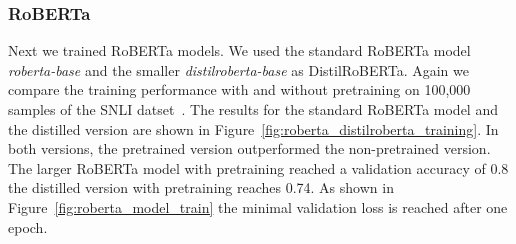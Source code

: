 \documentclass[acmsmall,nonacm]{acmart}
\begin{document}
\newpage
\subsubsection{RoBERTa}
Next we trained RoBERTa models. We used the standard RoBERTa model \textit{roberta-base} and the smaller \textit{distilroberta-base} as DistilRoBERTa. 
Again we compare the training performance with and without pretraining on 100,000 samples of the SNLI datset~\cite{snli-bowman2015}. The results for the standard RoBERTa model and the distilled version are shown in Figure~\ref{fig:roberta_distilroberta_training}. In both versions, the pretrained version outperformed the non-pretrained version. The larger RoBERTa model with pretraining reached a validation accuracy of 0.8 the distilled version with pretraining reaches 0.74. As shown in Figure~\ref{fig:roberta_model_train} the minimal validation loss is reached after one epoch. %
\end{document}
